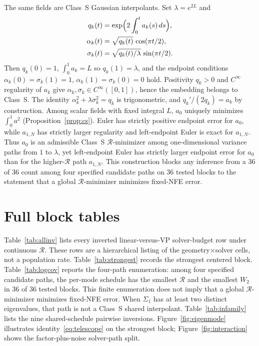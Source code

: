 \documentclass[11pt,a4paper]{article}
\theoremstyle{remark}
\newcommand{\wtwo}{W_2}
\newcommand{\cR}{\mathcal{R}}
\begin{document}
The same fields are Class~S Gaussian interpolants. Set $\lambda=e^{2L}$ and
\begin{equation}
\begin{aligned}
  q_k(t)&=\exp\Bigl(2\int_0^t a_k(s)\,ds\Bigr),\\
  \alpha_k(t)&=\sqrt{q_k(t)}\,\cos(\pi t/2),\\
  \sigma_k(t)&=\sqrt{q_k(t)/\lambda}\,\sin(\pi t/2).
\end{aligned}
\end{equation}
Then $q_k(0)=1$, $\int_0^1 a_k=L$ so $q_k(1)=\lambda$, and the endpoint
conditions $\alpha_k(0)=\sigma_k(1)=1$, $\alpha_k(1)=\sigma_k(0)=0$ hold.
Positivity $q_k>0$ and $C^\infty$ regularity of $a_k$ give
$\alpha_k,\sigma_k\in C^\infty([0,1])$, hence the embedding belongs to
Class~S. The identity
$\alpha_k^2+\lambda\sigma_k^2=q_k$ is trigonometric, and
$q_k'/(2q_k)=a_k$ by construction. Among scalar fields with fixed integral
$L$, $a_0$ uniquely minimizes $\int_0^1 a^2$ (Proposition~\ref{prop:cs}).
Euler has strictly positive endpoint error for $a_0$, while $a_{1,N}$ has
strictly larger regularity and left-endpoint Euler is exact for $a_{1,N}$.
Thus $a_0$ is an admissible Class~S $\cR$-minimizer among one-dimensional
variance paths from $1$ to $\lambda$,
yet left-endpoint Euler has strictly larger endpoint error for $a_0$ than
for the higher-$\cR$ path $a_{1,N}$. This construction blocks any inference
from a $36$ of $36$ count among four specified candidate paths on $36$
tested blocks to the statement that a global $\cR$-minimizer minimizes
fixed-NFE error.

\section{Full block tables}
\label{app:tables}

Table~\ref{tab:allinv} lists every inverted linear-versus-VP solver-budget
row under continuous $\cR$. These rows are a hierarchical listing of the
\nInversionCells{} geometry$\times$solver cells, not a population rate.
Table~\ref{tab:strongest} records the strongest centered block.
Table~\ref{tab:logcov} reports the four-path enumeration: among four
specified candidate paths, the per-mode schedule has the smallest $\cR$
and the smallest $\wtwo$ in $36$ of $36$ tested blocks. This finite
enumeration does not imply that a global $\cR$-minimizer minimizes
fixed-NFE error. When $\Sigma_1$ has at least two distinct eigenvalues,
that path is not a Class~S shared interpolant.
Table~\ref{tab:infamily} lists the nine shared-schedule pairwise inversions.
Figure~\ref{fig:eigenmode} illustrates identity~\eqref{eq:telescope} on the
strongest block; Figure~\ref{fig:interaction} shows the factor-plus-noise
solver-path split.
\end{document}
